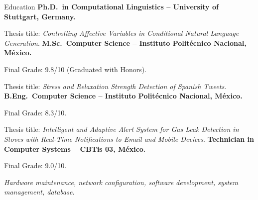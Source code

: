 \begin{rubric}{Education}
\entry*[2021 -- 2025 ]%
	\textbf{Ph.D.~in Computational Linguistics -- University of Stuttgart, Germany.} \par
    Thesis title: \textit{Controlling Affective Variables in Conditional Natural Language Generation}.
%
\entry*[2015 -- 2017]%
	\textbf{M.Sc.~Computer Science -- Instituto Politécnico Nacional, México.}\par
    Final Grade: 9.8/10 (Graduated with Honors).\par
	Thesis title: \textit{Stress and Relaxation Strength Detection of Spanish Tweets}.
% 
\entry*[2011 -- 2015]%
	\textbf{B.Eng.~Computer Science -- Instituto Politécnico Nacional, México.}\par
    Final Grade: 8.3/10.\par
	Thesis title: \textit{Intelligent and Adaptive Alert System for Gas Leak Detection in Stoves with Real-Time Notifications to Email and Mobile Devices}.
%
\entry*[2008 -- 2011]%
    \textbf{Technician in Computer Systems -- CBTis 03, México.}\par
    Final Grade: 9.0/10.\par
	\textit{Hardware maintenance, network configuration, software development, system management, database}.
\end{rubric}